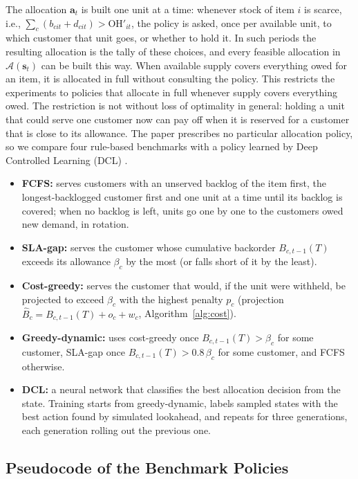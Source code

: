 \documentclass[11pt, a4paper]{article}
\theoremstyle{definition}
\theoremstyle{remark}
\newcommand{\OH}{\text{OH}}
\begin{document}
The allocation $\mathbf{a}_t$ is built one unit at a time: whenever stock of item $i$ is scarce, i.e., $\sum_{c} (b_{cit} + d_{cit}) > \OH'_{it}$, the policy is asked, once per available unit, to which customer that unit goes, or whether to hold it. In such periods the resulting allocation is the tally of these choices, and every feasible allocation in $\mathcal{A}(\mathbf{s}_t)$ can be built this way. When available supply covers everything owed for an item, it is allocated in full without consulting the policy. This restricts the experiments to policies that allocate in full whenever supply covers everything owed. The restriction is not without loss of optimality in general: holding a unit that could serve one customer now can pay off when it is reserved for a customer that is close to its allowance. The paper prescribes no particular allocation policy, so we compare four rule-based benchmarks with a policy learned by Deep Controlled Learning (DCL) \citep{temizoz2025dcl}.

\begin{itemize}
    \item \textbf{FCFS:} serves customers with an unserved backlog of the item first, the longest-backlogged customer first and one unit at a time until its backlog is covered; when no backlog is left, units go one by one to the customers owed new demand, in rotation.
    \item \textbf{SLA-gap:} serves the customer whose cumulative backorder $B_{c,t-1}(T)$ exceeds its allowance $\beta_c$ by the most (or falls short of it by the least).
    \item \textbf{Cost-greedy:} serves the customer that would, if the unit were withheld, be projected to exceed $\beta_c$ with the highest penalty $p_c$ (projection $\widehat{B}_c = B_{c,t-1}(T) + o_c + w_c$, Algorithm~\ref{alg:cost}).
    \item \textbf{Greedy-dynamic:} uses cost-greedy once $B_{c,t-1}(T) > \beta_c$ for some customer, SLA-gap once $B_{c,t-1}(T) > 0.8\,\beta_c$ for some customer, and FCFS otherwise.
    \item \textbf{DCL:} a neural network that classifies the best allocation decision from the state. Training starts from greedy-dynamic, labels sampled states with the best action found by simulated lookahead, and repeats for three generations, each generation rolling out the previous one.
\end{itemize}

\subsection{Pseudocode of the Benchmark Policies}
\label{sec:policies}
\end{document}
